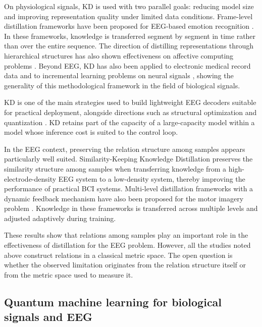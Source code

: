 On physiological signals, KD is used with two parallel goals:
reducing model size and improving representation quality under
limited data conditions. Frame-level distillation frameworks have
been proposed for EEG-based emotion recognition \cite{wang2021fldnet,gu2023framelevel}.
In these frameworks, knowledge is transferred segment by segment in
time rather than over the entire sequence. The direction of
distilling representations through hierarchical structures has also
shown effectiveness on affective computing problems
\cite{zhang2023distilling}. Beyond EEG, KD has also been applied to
electronic medical record data \cite{ibrahim2022knowledge} and to
incremental learning problems on neural signals
\cite{garcia-salinas2023intrasubject}, showing the generality of this
methodological framework in the field of biological signals.

KD is one of the main strategies used to build lightweight EEG
decoders suitable for practical deployment, alongside directions such
as structural optimization and quantization \cite{li2025lightweight}.
KD retains part of the capacity of a large-capacity model within a
model whose inference cost is suited to the control loop.

In the EEG context, preserving the relation structure among samples
appears particularly well suited. Similarity-Keeping Knowledge
Distillation \cite{huang2024enhancing} preserves the similarity
structure among samples when transferring knowledge from a
high-electrode-density EEG system to a low-density system, thereby
improving the performance of practical BCI systems. Multi-level
distillation frameworks with a dynamic feedback mechanism have also
been proposed for the motor imagery problem \cite{wu2026multilevel}.
Knowledge in these frameworks is transferred across multiple levels
and adjusted adaptively during training.

These results show that relations among samples play an important
role in the effectiveness of distillation for the EEG problem.
However, all the studies noted above construct relations in a
classical metric space. The open question is whether the observed
limitation originates from the relation structure itself or from the
metric space used to measure it.

\subsection{Quantum machine learning for biological signals and EEG}
\label{sec:qml}

